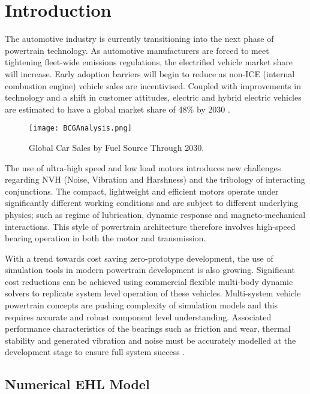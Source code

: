 \chapter{Introduction}
\label{Introduction}

The automotive industry is currently transitioning into the next phase of powertrain technology. As automotive manufacturers are forced to meet tightening fleet-wide emissions regulations, the electrified vehicle market share will increase. Early adoption barriers will begin to reduce as non-ICE (internal combustion engine) vehicle sales are incentivised. Coupled with improvements in technology and a shift in customer attitudes, electric and hybrid electric vehicles are estimated to have a global market share of 48\% by 2030 \cite{Mosquet2018}.

\begin{figure}[H]
	\centerline{\texttt{[image: BCGAnalysis.png]}}
	\caption{Global Car Sales by Fuel Source Through 2030.}
	\label{BCGAnalysis}
\end{figure}

The use of ultra-high speed and low load motors introduces new challenges regarding NVH (Noise, Vibration and Harshness) and the tribology of interacting conjunctions. The compact, lightweight and efficient motors operate under significantly different working conditions and are subject to different underlying physics; such as regime of lubrication, dynamic response and magneto-mechanical interactions. This style of powertrain architecture therefore involves high-speed bearing operation in both the motor and transmission.

With a trend towards cost saving zero-prototype development, the use of simulation tools in modern powertrain development is also growing. Significant cost reductions can be achieved using commercial flexible multi-body dynamic solvers to replicate system level operation of these vehicles. Multi-system vehicle powertrain concepts are pushing complexity of simulation models and this requires accurate and robust component level understanding. Associated performance characteristics of the bearings such as friction and wear, thermal stability and generated vibration and noise must be accurately modelled at the development stage to ensure full system success \cite{Wensing1972a}. 

\section{Numerical EHL Model}

